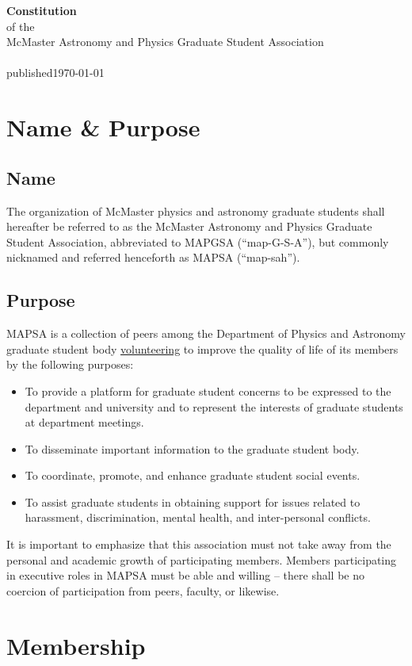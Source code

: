 \documentclass[11pt]{article}
\begin{document}
	
	\begin{center}
		\textbf{\Huge{Constitution}}\\\normalsize{of the}\\McMaster Astronomy and Physics Graduate Student Association\\~\\
		published\today
	\end{center}
	\tableofcontents	
	\pagebreak
	\section{Name \& Purpose}
	\subsection{Name}
	The organization of McMaster physics and astronomy graduate students shall hereafter be referred to as the McMaster Astronomy and Physics Graduate Student Association, abbreviated to MAPGSA (``map-G-S-A''), but commonly nicknamed and referred henceforth as MAPSA (``map-sah'').
	\subsection{Purpose}
	MAPSA is a collection of peers among the Department of Physics and Astronomy graduate student body \underline{volunteering} to improve the quality of life of its members by the following purposes:
	\begin{itemize}
		\item To provide a platform for graduate student concerns to be expressed to the department and university and to represent the interests of graduate students at department meetings.
		\item To disseminate important information to the graduate student body.
		\item To coordinate, promote, and enhance graduate student social events.
		\item To assist graduate students in obtaining support for issues related to harassment, discrimination, mental health, and inter-personal conflicts.
	\end{itemize}
	It is important to emphasize that this association must not take away from the personal and academic growth of participating members. Members participating in executive roles in MAPSA must be able and willing -- there shall be no coercion of participation from peers, faculty, or likewise.
	
	\section{Membership}
\end{document}

